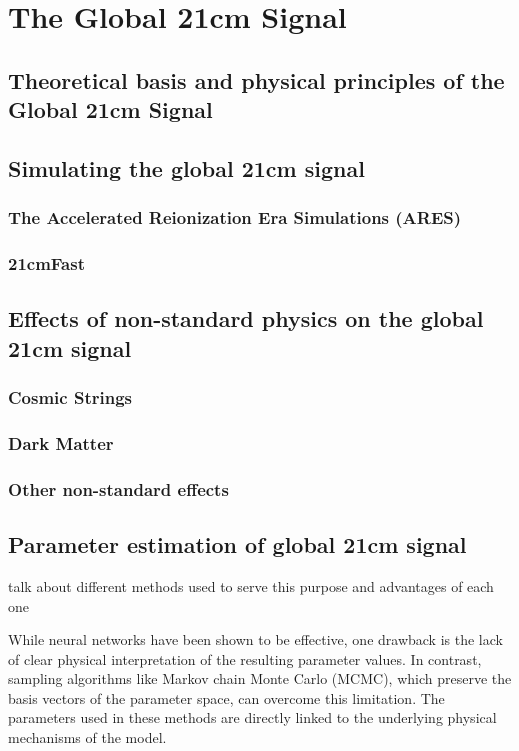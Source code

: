 \documentclass[12pt, TexShade, letterpaper]{report}
\begin{document}
\chapter{The Global 21cm Signal}
\label{chap:global21cm}
\section{Theoretical basis and physical principles of the Global 21cm Signal}
\section{Simulating the global 21cm signal}
\subsection{The Accelerated Reionization Era Simulations (ARES)}
\subsection{21cmFast}
\section{Effects of non-standard physics on the global 21cm signal}
\label{chap:global21cm,sub:non_standard}
\subsection{Cosmic Strings}
\subsection{Dark Matter}
\subsection{Other non-standard effects}
\section{Parameter estimation of global 21cm signal}
\label{chap:global21cm,sub:parameter_estimation}
talk about different methods used to serve this purpose and advantages of each one\par
While neural networks have been shown to be effective, one drawback is the lack of clear physical interpretation of the resulting parameter values. In contrast, sampling algorithms like Markov chain Monte Carlo (MCMC), which preserve the basis vectors of the parameter space, can overcome this limitation. The parameters used in these methods are directly linked to the underlying physical mechanisms of the model.
\end{document}

